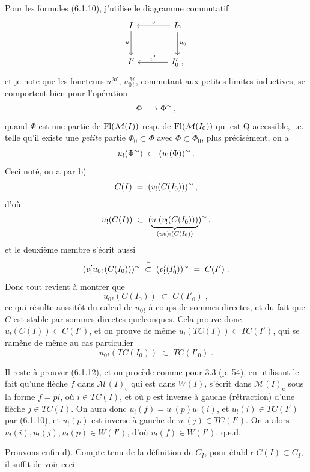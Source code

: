 Pour les formules (6.1.10), j'utilise le diagramme commutatif
\[
\begin{tikzcd}[row sep=large, column sep=large]
I \arrow[d, "u"'] & I_0 \arrow[l, "v"'] \arrow[d, "u_0"] \\
I' & I'_0\;, \arrow[l, "v'"']
\end{tikzcd}
\]
et je note que les foncteurs $u_!^{\mathcal{M}}$, $u_{0\,!}^{\mathcal{M}}$, commutant aux petites limites inductives, se
comportent bien pour l'opération
\[
\Phi \longmapsto \Phi^{\sim}\,,
\]
quand $\Phi$ est une partie de $\operatorname{Fl}(\mathcal{M}(I))$ resp. de $\operatorname{Fl}(\mathcal{M}(I_0))$ qui est Q-accessible, i.e. telle qu'il existe une \textit{petite} partie $\Phi_0 \subset \Phi$ avec $\Phi \subset \tilde{\Phi}_0$, plus précisément, on a
\[
u_!(\Phi^{\sim}) \;\subset\; (u_!(\Phi))^{\sim}\,.
\]
Ceci noté, on a par b)
\[
C(I) \;=\; (v_!(C(I_0)))^{\sim}\,,
\]
d'où
\[
u_!(C(I)) \;\subset\; (\underbrace{u_!(v_!(C(I_0)))}_{(uv)_!(C(I_0))})^{\sim}\,,
\]
et le deuxième membre s'écrit aussi
\[
(v'_!u_{0\,!}(C(I_0)))\tl \;\overset{?}{\subset}\; (v'_!(I'_0))\tl \;=\; C(I')\;. %
\]
Donc tout revient à montrer que
\[
u_{0\,!}(C(I_0)) \;\subset\; C(I'_0)\;,
\tag*{(6.1.16)}
\]
ce qui résulte aussitôt du calcul de $u_{0\,!}$ à coups de sommes directes, et du fait que $C$ est stable par sommes directes quelconques. Cela prouve donc $u_!(C(I)) \subset C(I')$, et on prouve de même $u_!(TC(I)) \subset TC(I')$, qui se ramène de même au cas particulier
\[
u_{0\,!}(TC(I_0)) \;\subset\; TC(I'_0)\;.
\tag*{(6.1.17)}
\]



Il reste à prouver (6.1.12), et on procède comme pour 3.3 (p. 54), en utilisant le fait qu'une flèche $f$ dans $\mathcal{M}(I)_{\mathrm{c}}$ qui est dans $W(I)$, s'écrit dans $\mathcal{M}(I)_{\mathrm{c}}$ sous la forme $f = pi$, où $i \in TC(I)$, et où $p$ est inverse à gauche (rétraction) d'une flèche $j \in TC(I)$. On aura donc $u_!(f) = u_!(p)u_!(i)$, et $u_!(i) \in TC(I')$ par (6.1.10), et $u_!(p)$ est inverse à gauche de $u_!(j) \in TC(I')$. On a alors $u_!(i), u_!(j), u_!(p) \in W(I')$, d'où $u_!(f) \in W(I')$, q.e.d.

Prouvons enfin d). Compte tenu de la définition de $C_I$, pour établir $C(I) \subset C_I$, il suffit de voir ceci :

